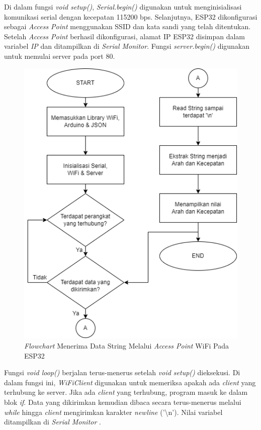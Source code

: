 Di dalam fungsi \emph{void setup()}, \emph{Serial.begin()} digunakan untuk menginisialisasi komunikasi serial dengan kecepatan 115200 bps. Selanjutnya, ESP32 dikonfigurasi sebagai \emph{Access Point} menggunakan SSID dan kata sandi yang telah ditentukan. Setelah \emph{Access Point} berhasil dikonfigurasi, alamat IP ESP32 disimpan dalam variabel \emph{IP} dan ditampilkan di \emph{Serial Monitor}. Fungsi \emph{server.begin()} digunakan untuk memulai server pada port 80.

\begin{figure}[H]
\centering
\includegraphics[scale=0.5]{gambar/bab3/4. String WiFi.png}
\caption{\emph{Flowchart} Menerima Data String Melalui \emph{Access Point} WiFi Pada ESP32}
\label{fig:Flowchart 4 String}
\end{figure}

Fungsi \emph{void loop()} berjalan terus-menerus setelah \emph{void setup()} dieksekusi. Di dalam fungsi ini, \emph{WiFiClient} digunakan untuk memeriksa apakah ada \emph{client} yang terhubung ke server. Jika ada \emph{client} yang terhubung, program masuk ke dalam blok \emph{if}. Data yang dikirimkan kemudian dibaca secara terus-menerus melalui \emph{while} hingga \emph{client} mengirimkan karakter \emph{newline} ('\textbackslash n'). Nilai variabel ditampilkan di \emph{Serial Monitor} \parencite{ekatama2024perancangan}.

